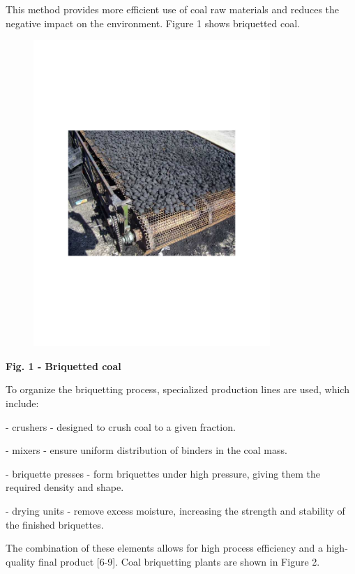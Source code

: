This method provides more efficient use of coal raw materials and
reduces the negative impact on the environment. Figure 1 shows
briquetted coal.

\begin{figure}[H]
	\centering
	\includegraphics[width=0.8\textwidth]{media/gorn2/image2}
	\caption*{}
\end{figure}


{\bfseries Fig. 1 - Briquetted coal}

To organize the briquetting process, specialized production lines are
used, which include:

- crushers - designed to crush coal to a given fraction.

- mixers - ensure uniform distribution of binders in the coal mass.

- briquette presses - form briquettes under high pressure, giving them
the required density and shape.

- drying units - remove excess moisture, increasing the strength and
stability of the finished briquettes.

The combination of these elements allows for high process efficiency and
a high-quality final product {[}6-9{]}. Coal briquetting plants are
shown in Figure 2.

